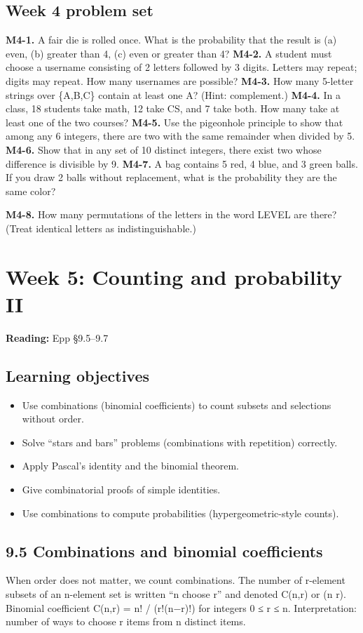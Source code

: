 \documentclass[11pt]{article}
\begin{document}
\subsection*{Week 4 problem set}
\textbf{M4-1.} A fair die is rolled once. What is the probability that the result is (a) even, (b)
greater than 4, (c) even or greater than 4?
\textbf{M4-2.} A student must choose a username consisting of 2 letters followed by 3 digits.
Letters may repeat; digits may repeat. How many usernames are possible?
\textbf{M4-3.} How many 5-letter strings over \{A,B,C\} contain at least one A? (Hint:
complement.)
\textbf{M4-4.} In a class, 18 students take math, 12 take CS, and 7 take both. How many take at
least one of the two courses?
\textbf{M4-5.} Use the pigeonhole principle to show that among any 6 integers, there are two
with the same remainder when divided by 5.
\textbf{M4-6.} Show that in any set of 10 distinct integers, there exist two whose difference is
divisible by 9.
\textbf{M4-7.} A bag contains 5 red, 4 blue, and 3 green balls. If you draw 2 balls without
replacement, what is the probability they are the same color?

\textbf{M4-8.} How many permutations of the letters in the word LEVEL are there? (Treat
identical letters as indistinguishable.)

\clearpage
\section{Week 5: Counting and probability II}
\textbf{Reading:} Epp §9.5–9.7
\subsection*{Learning objectives}
\begin{itemize}[leftmargin=*,itemsep=0.25em]
\item Use combinations (binomial coefficients) to count subsets and selections without order.
\item Solve “stars and bars” problems (combinations with repetition) correctly.
\item Apply Pascal’s identity and the binomial theorem.
\item Give combinatorial proofs of simple identities.
\item Use combinations to compute probabilities (hypergeometric-style counts).
\end{itemize}
\subsection{9.5 Combinations and binomial coefficients}
When order does not matter, we count combinations. The number of r-element subsets of
an n-element set is written “n choose r” and denoted C(n,r) or (n r).
Binomial coefficient
C(n,r) = n! / (r!(n−r)!) for integers 0 ≤ r ≤ n.
Interpretation: number of ways to choose r items from n distinct items.
\end{document}
